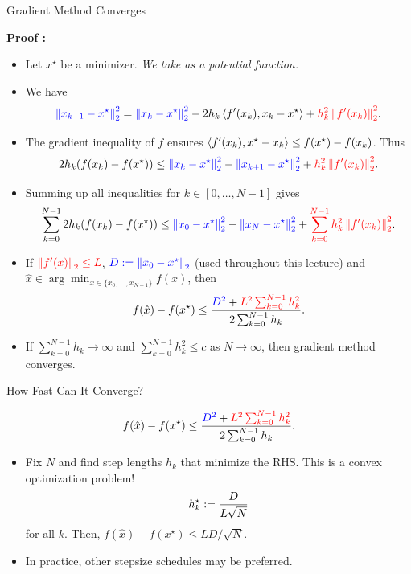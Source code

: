 \documentclass[9pt]{beamer}
\begin{document}
\begin{frame}{Gradient Method Converges}

  \textbf{Proof :}
  \begin{itemize}
  \item Let $x^\star$ be a minimizer. \emph{We take  as a potential function.}
  \item<2-> We have
    \[
      {\color{blue} \left\|x_{k+1}-x^\star\right\|^2_2} = {\color{blue} \left\|x_k-x^\star\right\|^2_2} - 2 h_k \left<f'(x_k) ,  x_k -x^\star\right> + {\color{red} h_k^2 \left\|f'(x_k)\right\|_2^2}.
    \]
  \item<3-> The gradient inequality of $f$ ensures $\left<f'(x_k), x^\star-x_k\right>\leq f(x^\star)-f(x_k)$. Thus
    \[
      2 h_k (f(x_k)-f(x^\star)) \leq {\color{blue} \left\|x_k-x^\star\right\|^2_2} - {\color{blue} \left\|x_{k+1}-x^\star\right\|_2^2} + {\color{red} h_k^2 \left\|f'(x_k)\right\|_2^2}.
    \]
  \item<4-> Summing up all inequalities for $k\in [0, \dots, N-1]$ gives
    \[
      \sum_{k=0}^{N-1} 2 h_k (f(x_k)-f(x^\star)) \leq {\color{blue} \left\|x_0-x^\star\right\|_2^2} - {\color{blue} \left\|x_N-x^\star\right\|_2^2} + {\color{red} \sum_{k=0}^{N-1} h_k^2 \left\|f'(x_k)\right\|_2^2}.
    \]
  \item<5-> If ${\color{red} \left\|f'(x)\right\|_2\leq L}$, ${\color{blue} D:= \left\|x_0-x^\star\right\|_2}$ (used throughout this lecture) and $\hat x\in\arg\min_{x\in\{x_0,\dots,x_{N-1}\}}f(x)$, then
    \[
      f(\hat x) - f(x^\star)\leq \frac{{\color{blue} D^2}+{\color{red} L^2 \sum_{k=0}^{N-1} h_k^2}}{2 \sum_{k=0}^{N-1} h_k}.
    \]
  \item<6-> If $\sum_{k=0}^{N-1} h_k\to\infty$ and $\sum_{k=0}^{N-1} h^2_k\leq c$ as $N\to\infty$, then gradient method converges.    
  \end{itemize}

  
\end{frame}

\begin{frame}{How Fast Can It Converge?}

  \begin{center}
    \begin{tcolorbox}[width=0.5\textwidth]
      \[
        f(\hat x) - f(x^\star)\leq \frac{{\color{blue} D^2}+{\color{red} L^2 \sum_{k=0}^{N-1} h_k^2}}{2 \sum_{k=0}^{N-1} h_k}.
      \]
    \end{tcolorbox}
  \end{center}

  \begin{itemize}

  \item Fix $N$ and find step lengths $h_k$ that minimize the RHS. This is a convex optimization problem! 
    \[
      h_k^\star := \frac{D}{L \sqrt{N}}
    \]
    for all $k$. Then, $f(\hat x) - f(x^\star)\leq L D /\sqrt{N}$.
  \item<2-> In practice, other stepsize schedules may be preferred.
  \end{itemize}
  
\end{frame}
\end{document}
